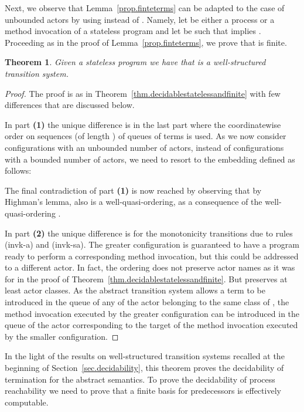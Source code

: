 \documentclass{LMCS}
\theoremstyle{plain}\newtheorem{proposition}[thm]{Proposition}
\theoremstyle{plain}\newtheorem{lemma}[thm]{Lemma}
\theoremstyle{plain}\newtheorem{theorem}[thm]{Theorem}
\theoremstyle{plain}\newtheorem{corollary}[thm]{Corollary}
\newif\ifconf \conffalse
\newcommand{\rulename}[1]{{\sc(#1)}}
\begin{document}
Next, we observe that Lemma~\ref{prop.finteterms}
can be adapted to the case of unbounded actors
by using  instead of .
Namely, let  be either a process or a method invocation 
of a stateless program and
let  be
such that  implies . 
Proceeding as in the proof of Lemma~\ref{prop.finteterms},
we prove that
 is finite.


\begin{theorem}
\label{thm.decidableforunbounded}
Given a stateless program 
we have that  is a well-structured transition system.
\end{theorem}

\ifconf
\else

\begin{proof}
The proof is as in Theorem~\ref{thm.decidablestatelessandfinite}
with few differences that are discussed below.

In part {\bf (1)} the unique difference is in the 
last part where the coordinatewise order 
on sequences (of length ) of queues of terms 
is used. As we now consider configurations with an unbounded 
number of actors, instead of configurations with a bounded
number  of actors, we need to resort to the 
embedding  defined as follows:

The final contradiction of part {\bf (1)}
is now reached by observing that by Highman's lemma, 
also  is a well-quasi-ordering, as a consequence
of the well-quasi-ordering .

In part {\bf (2)} the unique difference
is for the monotonicity 
transitions due to rules \rulename{invk-a} and \rulename{invk-sa}. The greater configuration
is guaranteed to have a program ready to perform
a corresponding method invocation, but this could 
be addressed to a different actor.
In fact, the ordering 
does not preserve actor names as it was for  
in the proof of Theorem~\ref{thm.decidablestatelessandfinite}. 
But  preserves at least actor
classes. As the abstract transition
system  allows a term  to be
introduced in the queue of any of the actor 
belonging to the same class of ,
the method invocation executed by the greater
configuration can be introduced in the 
queue of the actor corresponding to the target
of the method invocation executed by the
smaller configuration.
\end{proof}
\fi
In the light of the results on well-structured transition
systems recalled at the beginning of Section~\ref{sec.decidability},
this theorem proves the decidability of termination for the abstract semantics.
To prove the decidability of process reachability
we need to prove that a finite basis for predecessors
is effectively computable.
\end{document}
